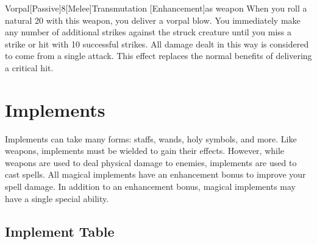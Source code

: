         \begin{magicitemdef}{Vorpal}[Passive]{8}[Melee]{Transmutation [Enhancement]}{as weapon}
             When you roll a natural 20 with this weapon, you deliver a vorpal blow.
            You immediately make any number of additional strikes against the struck creature until you miss a strike or hit with 10 successful strikes.
            All damage dealt in this way is considered to come from a single attack.
            This effect replaces the normal benefits of delivering a critical hit.
        \end{magicitemdef}

\section{Implements}
    Implements can take many forms: staffs, wands, holy symbols, and more.
    Like weapons, implements must be wielded to gain their effects.
    However, while weapons are used to deal physical damage to enemies, implements are used to cast spells.
    All magical implements have an enhancement bonus to improve your spell damage.
    In addition to an enhancement bonus, magical implements may have a single special ability.

    \onecolumn
    \subsection{Implement Table}

